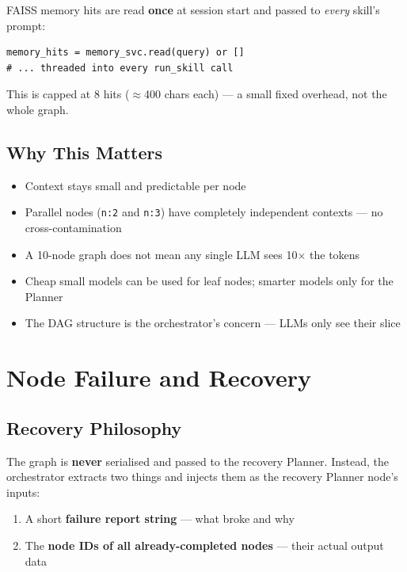 \documentclass[12pt,a4paper]{article}
\begin{document}
FAISS memory hits are read \textbf{once} at session start and passed to
\emph{every} skill's prompt:

\begin{lstlisting}[style=pycode, caption={Memory read once, shared across all nodes — flow.py:221}]
memory_hits = memory_svc.read(query) or []
# ... threaded into every run_skill call
\end{lstlisting}

This is capped at 8 hits ($\approx$400 chars each) — a small fixed overhead,
not the whole graph.

\subsection{Why This Matters}

\begin{itemize}[noitemsep]
  \item Context stays small and predictable per node
  \item Parallel nodes (\texttt{n:2} and \texttt{n:3}) have completely
    independent contexts — no cross-contamination
  \item A 10-node graph does not mean any single LLM sees 10$\times$ the tokens
  \item Cheap small models can be used for leaf nodes; smarter models only for
    the Planner
  \item The DAG structure is the orchestrator's concern — LLMs only see their
    slice
\end{itemize}

\section{Node Failure and Recovery}

\subsection{Recovery Philosophy}

\begin{notebox}
The graph is \textbf{never} serialised and passed to the recovery Planner.
Instead, the orchestrator extracts two things and injects them as the recovery
Planner node's inputs:
\begin{enumerate}[noitemsep]
  \item A short \textbf{failure report string} — what broke and why
  \item The \textbf{node IDs of all already-completed nodes} — their actual
    output data
\end{enumerate}
\end{notebox}
\end{document}
